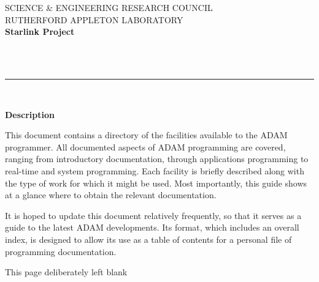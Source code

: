 

\thispagestyle{empty}
SCIENCE \& ENGINEERING RESEARCH COUNCIL \hfill \stardocname\\
RUTHERFORD APPLETON LABORATORY\\
{\large\bf Starlink Project\\}
{\large\bf \stardoccategory\ \stardocnumber}
\begin{flushright}
\stardocauthors\\
\stardocdate
\end{flushright}
\vspace{-4mm}
\rule{\textwidth}{0.5mm}
\vspace{5mm}
\begin{center}
{\Huge\bf  \stardoctitle \\ [3.5ex]}
{\Large \bf  \stardocdate}
\end{center}
\vspace{20mm}

\begin{center}
{\Large\bf Description}
\end{center}

This document contains a directory of the facilities available to the ADAM
programmer. All documented aspects of ADAM programming are covered, ranging from
introductory documentation, through applications programming to real-time and
system programming. Each facility is briefly described along with the type of
work for which it might be used. Most importantly, this guide shows at a glance
where to obtain the relevant documentation.

It is hoped to update this document relatively frequently, so that it serves as
a guide to the latest ADAM developments. Its format, which includes an overall
index, is designed to allow its use as a table of contents for a personal file
of programming documentation.

\newpage
\thispagestyle{empty}
\vspace*{\fill}
\begin{center}
{\Large This page deliberately left blank}
\end{center}
\vspace*{\fill}

\newpage
{}
\renewcommand{\thepage}{\roman{page}}
\setcounter{page}{1}

